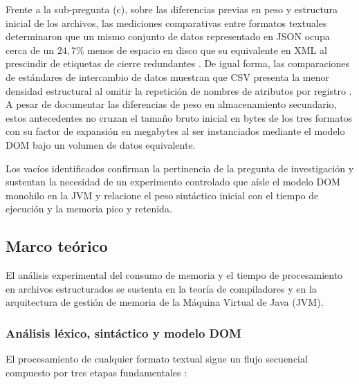 Frente a la sub-pregunta (c), sobre las diferencias previas en peso y estructura inicial de los archivos, las mediciones comparativas entre formatos textuales determinaron que un mismo conjunto de datos representado en JSON ocupa cerca de un $24{,}7\%$ menos de espacio en disco que su equivalente en XML al prescindir de etiquetas de cierre redundantes \cite{ieee_les_2024}. De igual forma, las comparaciones de estándares de intercambio de datos muestran que CSV presenta la menor densidad estructural al omitir la repetición de nombres de atributos por registro \cite{ieee_icoailo_2025}. A pesar de documentar las diferencias de peso en almacenamiento secundario, estos antecedentes no cruzan el tamaño bruto inicial en bytes de los tres formatos con su factor de expansión en megabytes al ser instanciados mediante el modelo DOM bajo un volumen de datos equivalente.

Los vacíos identificados confirman la pertinencia de la pregunta de investigación y sustentan la necesidad de un experimento controlado que aísle el modelo DOM monohilo en la JVM y relacione el peso sintáctico inicial con el tiempo de ejecución y la memoria pico y retenida.

\subsection{Marco teórico}

El análisis experimental del consumo de memoria y el tiempo de procesamiento en archivos estructurados se sustenta en la teoría de compiladores y en la arquitectura de gestión de memoria de la Máquina Virtual de Java (JVM).

\subsubsection{Análisis léxico, sintáctico y modelo DOM}

El procesamiento de cualquier formato textual sigue un flujo secuencial compuesto por tres etapas fundamentales \cite{ieee_parsing_2008}:

